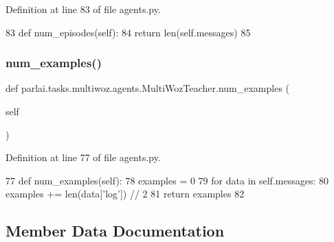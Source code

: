 Definition at line 83 of file agents.\+py.


\begin{DoxyCode}
83     \textcolor{keyword}{def }num\_episodes(self):
84         \textcolor{keywordflow}{return} len(self.messages)
85 
\end{DoxyCode}
\mbox{\label{classparlai_1_1tasks_1_1multiwoz_1_1agents_1_1MultiWozTeacher_ae7ddc7d7ceb61b839b58280ddcf4b390}} 
\subsubsection{\texorpdfstring{num\+\_\+examples()}{num\_examples()}}
{\footnotesize\ttfamily def parlai.\+tasks.\+multiwoz.\+agents.\+Multi\+Woz\+Teacher.\+num\+\_\+examples (\begin{DoxyParamCaption}\item[{}]{self }\end{DoxyParamCaption})}



Definition at line 77 of file agents.\+py.


\begin{DoxyCode}
77     \textcolor{keyword}{def }num\_examples(self):
78         examples = 0
79         \textcolor{keywordflow}{for} data \textcolor{keywordflow}{in} self.messages:
80             examples += len(data[\textcolor{stringliteral}{'log'}]) // 2
81         \textcolor{keywordflow}{return} examples
82 
\end{DoxyCode}


\subsection{Member Data Documentation}
\mbox{\label{classparlai_1_1tasks_1_1multiwoz_1_1agents_1_1MultiWozTeacher_a8e59cea446db2909435c9bac275e2539}} 
